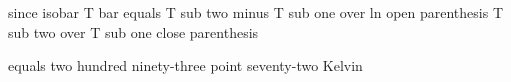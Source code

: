 since isobar T bar equals T sub two minus T sub one over ln open parenthesis T sub two over T sub one close parenthesis

equals two hundred ninety-three point seventy-two Kelvin